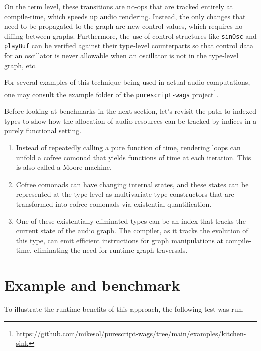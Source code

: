 \documentclass{article}
\begin{document}
On the term level, these transitions are no-ops that are tracked entirely at compile-time, which speeds up audio rendering. Instead, the only changes that need to be propagated to the graph are new control values, which requires no diffing between graphs.  Furthermore, the use of control structures like \texttt{sinOsc} and \texttt{playBuf} can be verified against their type-level counterparts so that control data for an oscillator is never allowable when an oscillator is not in the type-level graph, etc.

 For several examples of this technique being used in actual audio computations, one may consult the example folder of the \texttt{purescript-wags} project\footnote{\url{https://github.com/mikesol/purescript-wags/tree/main/examples/kitchen-sink}}.

Before looking at benchmarks in the next section, let's revisit the path to indexed types to show how the allocation of audio resources can be tracked by indices in a purely functional setting.

\begin{enumerate}
  \item Instead of repeatedly calling a pure function of time, rendering loops can unfold a cofree comonad that yields functions of time at each iteration. This is also called a Moore machine.
  \item Cofree comonads can have changing internal states, and these states can be represented at the type-level as multivariate type constructors that are transformed into cofree comonads via existential quantification.
  \item One of these existentially-eliminated types can be an index that tracks the current state of the audio graph. The compiler, as it tracks the evolution of this type, can emit efficient instructions for graph manipulations at compile-time, eliminating the need for runtime graph traversals.
\end{enumerate}

\section{Example and benchmark}
\label{sec:example_and_benchmark}

To illustrate the runtime benefits of this approach, the following test was run.
\end{document}
